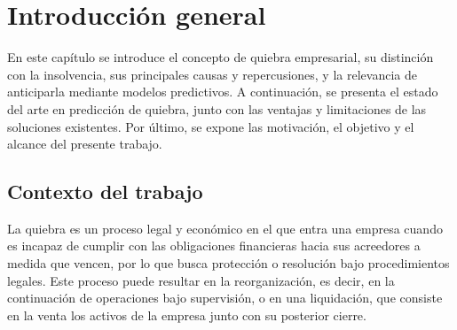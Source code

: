 
\chapter{Introducción general} %

\label{Chapter1} %
\label{IntroGeneral}

En este capítulo se introduce el concepto de quiebra empresarial, su distinción con la insolvencia, sus principales causas y repercusiones, y la relevancia de anticiparla mediante modelos predictivos. A continuación, se presenta el estado del arte en predicción de quiebra, junto con las ventajas y limitaciones de las soluciones existentes. Por último, se expone las motivación, el objetivo y el alcance del presente trabajo.


\newcommand{\keyword}[1]{\textbf{#1}}
\newcommand{\tabhead}[1]{\textbf{#1}}
\newcommand{\code}[1]{\texttt{#1}}
\newcommand{\file}[1]{\texttt{\bfseries#1}}
\newcommand{\option}[1]{\texttt{\itshape#1}}
\newcommand{\grados}{$^{\circ}$}



\section{Contexto del trabajo}

La quiebra es un proceso legal y económico en el que entra una empresa cuando es incapaz de cumplir con las obligaciones financieras hacia sus acreedores a medida que vencen, por lo que busca protección o resolución bajo procedimientos legales. Este proceso puede resultar en la reorganización, es decir, en la continuación de operaciones bajo supervisión, o en una liquidación, que consiste en la venta los activos de la empresa junto con su posterior cierre.

